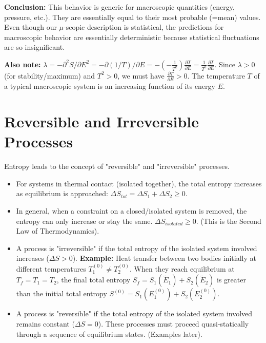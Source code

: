 \documentclass[11pt]{article}
\newcommand{\pderiv}[2]{\frac{\partial #1}{\partial #2}}
\newcommand{\tE}{\tilde{E}} %
\begin{document}
\textbf{Conclusion:} This behavior is generic for macroscopic quantities (energy, pressure, etc.). They are essentially equal to their most probable (=mean) values. Even though our $\mu$-scopic description is statistical, the predictions for macroscopic behavior are essentially deterministic because statistical fluctuations are so insignificant.

\textbf{Also note:} $\lambda = - \partial^2 S / \partial E^2 = - \partial(1/T)/\partial E = - (-\frac{1}{T^2}) \pderiv{T}{E} = \frac{1}{T^2} \pderiv{T}{E}$.
Since $\lambda > 0$ (for stability/maximum) and $T^2 > 0$, we must have $\pderiv{T}{E} > 0$.
The temperature $T$ of a typical macroscopic system is an increasing function of its energy $E$.

\section*{Reversible and Irreversible Processes}

Entropy leads to the concept of "reversible" and "irreversible" processes.
\begin{itemize}
    \item For systems in thermal contact (isolated together), the total entropy increases as equilibrium is approached: $\Delta S_{tot} = \Delta S_1 + \Delta S_2 \ge 0$.
    \item In general, when a constraint on a closed/isolated system is removed, the entropy can only increase or stay the same. $\Delta S_{isolated} \ge 0$. (This is the Second Law of Thermodynamics).
    \item A process is "irreversible" if the total entropy of the isolated system involved increases ($\Delta S > 0$).
        \textbf{Example:} Heat transfer between two bodies initially at different temperatures $T_1^{(0)} \neq T_2^{(0)}$. When they reach equilibrium at $T_f = T_1 = T_2$, the final total entropy $S_f = S_1(\tE_1) + S_2(\tE_2)$ is greater than the initial total entropy $S^{(0)} = S_1(E_1^{(0)}) + S_2(E_2^{(0)})$.
    \item A process is "reversible" if the total entropy of the isolated system involved remains constant ($\Delta S = 0$). These processes must proceed quasi-statically through a sequence of equilibrium states. (Examples later).
\end{itemize}
\end{document}
